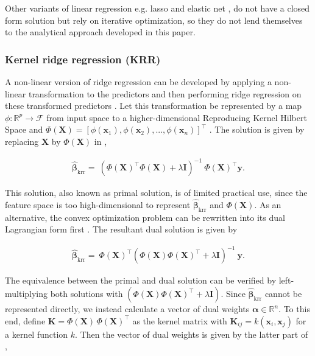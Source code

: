 \documentclass[utf8]{frontiersSCNS} %
\newcommand{\al}{\boldsymbol{\alpha}}
\newcommand{\bh}{\boldsymbol{\hat{\beta}}} %
\newcommand{\I}{\mathbf{I}}
\newcommand{\K}{\mathbf{K}}
\newcommand{\R}{\mathbb{R}}
\newcommand{\x}{\mathbf{x}}
\newcommand{\X}{\mathbf{X}}
\newcommand{\y}{\mathbf{y}}
\begin{document}
Other variants of linear regression e.g. lasso \citep{Tibshirani1996RegressionLasso} and elastic net \citep{Zou2005RegularizationNet}, do not have a closed form solution but rely on iterative optimization, so they do not lend themselves to the analytical approach developed in this paper.

\subsubsection{Kernel ridge regression (KRR)}

A non-linear version of ridge regression can be developed by applying a non-linear transformation to the predictors and then performing ridge regression on these transformed predictors \citep{Hainmueller2014KernelApproach}. Let this transformation be represented by a map $\phi:\R^p\rightarrow\mathcal{F}$ from input space to a higher-dimensional Reproducing Kernel Hilbert Space and $\Phi(\X) = [\phi(\x_1),\phi(\x_2),...,\phi(\x_n)]^\top$ \citep{Scholkopf2003AKernels,Hofmann2008}. The solution is given by replacing $\X$ by $\Phi(\X)$ in ,

\begin{align*}
\bh_\text{krr} =\ (\Phi(\X)^\top\Phi(\X) + \lambda\I)^{-1}\ \Phi(\X)^\top\y.
\end{align*}

This solution, also known as primal solution, is of limited practical use, since the feature space is too high-dimensional to represent $\bh_\text{krr}$ and $\Phi(\X)$. As an alternative, the convex optimization problem can be rewritten into its dual Lagrangian form first  
\citep{Bishop2007}. The resultant dual solution is given by

\begin{align}
\label{eq:kernel_ridge_dual_solution}
\bh_\text{krr}  =\ \Phi(\X)^\top (\Phi(\X)\Phi(\X)^\top + \lambda\I)^{-1}\ \y.
\end{align}


The equivalence between the primal and dual solution can be verified by left-multiplying both solutions with $(\Phi(\X)\Phi(\X)^\top + \lambda\I)$. Since $\bh_\text{krr}$ cannot be represented directly, we instead calculate a vector of dual weights $\al\in\R^n$. To this end, define $\K = \Phi(\X)\,\Phi(\X)^\top$ as the kernel matrix with $\K_{ij} = k(\x_i, \x_j)$ for a kernel function $k$. Then the vector of dual weights is given by the latter part of , 
\end{document}

